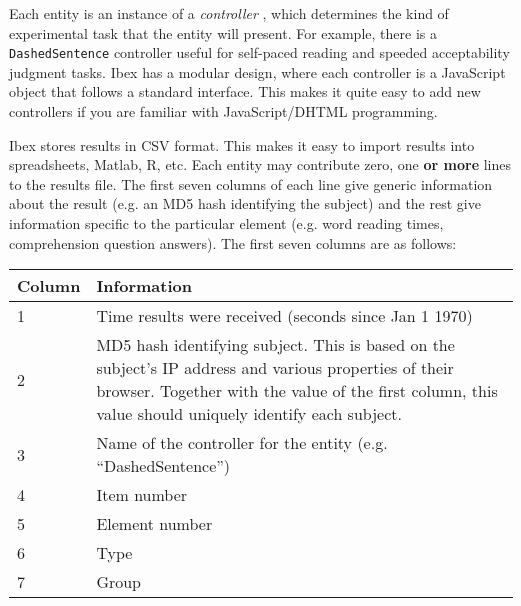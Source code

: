 \documentclass[11pt,letterpaper]{article}
\begin{document}
Each entity is an instance of a\textit{ controller} , which determines the kind of
experimental task that the entity will present.  For example, there is a
\texttt{DashedSentence} controller useful for self-paced reading and speeded
acceptability judgment tasks.  Ibex has a modular design, where each
controller is a JavaScript object that follows a standard interface. This
makes it quite easy to add new controllers if you are familiar with
JavaScript/DHTML programming.

Ibex stores results in CSV format. This makes it easy to import results into
spreadsheets, Matlab, R, etc. Each entity may contribute zero, one \textbf{or more}
lines to the results file. The first seven columns of each line give generic
information about the result (e.g. an MD5 hash identifying the subject) and
the rest give information specific to the particular element (e.g. word reading
times, comprehension question answers). The first seven columns are as follows:



\footnotesize
\begin{RaggedRight}
\sloppy
\begin{tabular}{|p{1.0491in}|p{4.4509in}|}
\hline
 \textbf{Column}  &  \textbf{Information}                                                  \\
\hline
 1         &  Time results were received (seconds since Jan 1 1970)          \\
\hline
 2         &  MD5 hash identifying subject. This is based on the subject's IP address and various properties of their browser. Together with the value of the first column, this value should uniquely identify each subject. \\
\hline
 3         &  Name of the controller for the entity (e.g. ``DashedSentence'') \\
\hline
 4         &  Item number                                                    \\
\hline
 5         &  Element number                                                 \\
\hline
 6         &  Type                                                           \\
\hline
 7         &  Group                                                          
\\\hline
\end{tabular}
\end{RaggedRight}
\fussy

\normalsize
\end{document}
